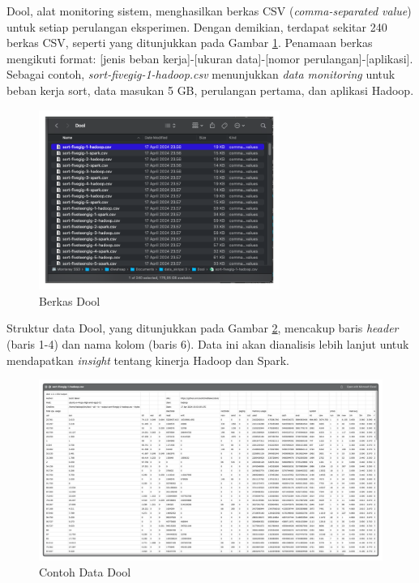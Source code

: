 Dool, alat monitoring sistem, menghasilkan berkas CSV (\textit{comma-separated value}) untuk setiap perulangan eksperimen. Dengan demikian, terdapat sekitar 240 berkas CSV, seperti yang ditunjukkan pada Gambar \ref{fig:data-dool-luar}. Penamaan berkas mengikuti format: [jenis beban kerja]-[ukuran data]-[nomor perulangan]-[aplikasi]. Sebagai contoh, \textit{sort-fivegig-1-hadoop.csv} menunjukkan \textit{data monitoring} untuk beban kerja sort, data masukan 5 GB, perulangan pertama, dan aplikasi Hadoop.

\begin{figure}[h]
    \centering
    \includegraphics[width=0.7\textwidth]{figures/ch04/data-dool-luar}
    \caption{Berkas Dool}
    \label{fig:data-dool-luar}
\end{figure}

Struktur data Dool, yang ditunjukkan pada Gambar \ref{fig:data-dool-dalam}, mencakup baris \textit{header} (baris 1-4) dan nama kolom (baris 6). Data ini akan dianalisis lebih lanjut untuk mendapatkan \textit{insight} tentang kinerja Hadoop dan Spark.

\begin{landscape}
\begin{figure}[h]
    \centering
    \includegraphics[width=\linewidth, height=0.5\linewidth]{figures/ch04/data-dool-dalam}
    \caption{Contoh Data Dool}
    \label{fig:data-dool-dalam}
\end{figure}
\end{landscape}

